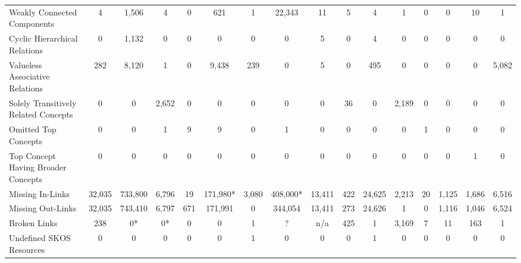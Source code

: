 \begin{table}[h]
\begin{center}
{\begin{tabular}{lccccccccccccccc}
Weakly Connected Components & 4 & 1,506 & 4 & 0 & 621 & 1 & 22,343 & 11 & 5 & 4 & 1 & 0 & 0 & 10 & 1 \\

Cyclic Hierarchical Relations & 0 & 1,132 & 0 & 0 & 0 & 0 & 0 & 5 & 0 & 4 & 0 & 0 & 0 & 0 & 0 \\

Valueless Associative Relations & 282 & 8,120 & 1 & 0 & 9,438 & 239 & 0 & 5 & 0 & 495 & 0 & 0 & 0 & 0 & 5,082 \\

Solely Transitively Related Concepts & 0 & 0 & 2,652 & 0 & 0 & 0 & 0 & 0 & 36 & 0 & 2,189 & 0 & 0 & 0 & 0 \\

Omitted Top Concepts & 0 & 0 & 1 & 9 & 9 & 0 & 1 & 0 & 0 & 0 & 0 & 1 & 0 & 0 & 0 \\

Top Concept Having Broader Concepts & 0 & 0 & 0 & 0 & 0 & 0 & 0 & 0 & 0 & 0 & 0 & 0 & 0 & 1 & 0 \\

\midrule

Missing In-Links & 32,035 & 733,800 & 6,796 & 19 & 171,980* & 3,080 & 408,000* & 13,411 & 422 & 24,625 & 2,213 & 20 & 1,125 & 1,686 & 6,516 \\

Missing Out-Links & 32,035 & 743,410 & 6,797 & 671 & 171,991 & 0 & 344,054 & 13,411 & 273 & 24,626 & 1 & 0 & 1,116 & 1,046 & 6,524 \\

Broken Links & 238 & 0* & 0* & 0 & 0 & 1 &?& n/a & 425 & 1 & 3,169 & 7 & 11 & 163 & 1 \\

Undefined SKOS Resources & 0 & 0 & 0 & 0 & 0 & 1 & 0 & 0 & 0 & 1 & 0 & 0 & 0 & 0 & 0 \\

\bottomrule
\end{tabular}
}
\end{center}
\end{table}


